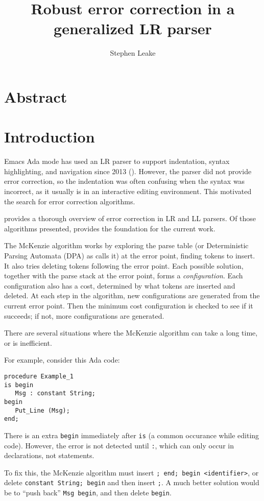 \documentclass{article}
\title{Robust error correction in a generalized LR parser}
\author{Stephen Leake}
\begin{document}
\section{Abstract}

\section{Introduction}
Emacs Ada mode has used an LR parser to support indentation, syntax
highlighting, and navigation since 2013 (\cite{Emacs Ada mode news}).
However, the parser did not provide error correction, so the
indentation was often confusing when the syntax was incorrect, as it
usually is in an interactive editing environment. This motivated the
search for error correction algorithms.

\cite{Grune 2008} provides a thorough overview of error correction in
LR and LL parsers. Of those algorithms presented, \cite{McKenzie 1995}
provides the foundation for the current work.

The McKenzie algorithm works by exploring the parse table (or
Deterministic Parsing Automata (DPA) as \cite{McKenzie 1995} calls it)
at the error point, finding tokens to insert. It also tries deleting
tokens following the error point. Each possible solution, together
with the parse stack at the error point, forms a
\textit{configuration}. Each configuration also has a cost, determined
by what tokens are inserted and deleted. At each step in the
algorithm, new configurations are generated from the current error
point. Then the minimum cost configuration is checked to see if it
succeeds; if not, more configurations are generated.

There are several situations where the McKenzie algorithm can take a
long time, or is inefficient.

For example, consider this Ada code:
\begin{verbatim}
procedure Example_1
is begin
   Msg : constant String;
begin
   Put_Line (Msg);
end;
\end{verbatim}

There is an extra \verb|begin| immediately after \verb|is| (a common
occurance while editing code). However, the error is not detected
until \verb|:|, which can only occur in declarations, not statements.

To fix this, the McKenzie algorithm must insert
\verb|; end; begin <identifier>|, or delete
\verb|constant String; begin| and then insert \verb|;|. A much better
solution would be to ``push back'' \verb|Msg begin|, and then delete
\verb|begin|.
\end{document}
